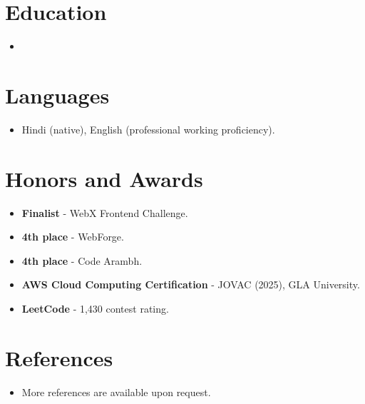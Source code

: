 \documentclass[11pt,a4paper,sans]{moderncv}
\begin{document}

\section{Education}
\vspace{1pt}
\begin{itemize}

\item{}

\end{itemize}


\section{Languages}
\vspace{1pt}
\begin{itemize}
\item {Hindi (native), English (professional working proficiency).}
\end{itemize}


\section{Honors and Awards}
\vspace{1pt}
\begin{itemize}
\item{\textbf{Finalist} - WebX Frontend Challenge.}
\item{\textbf{4th place} - WebForge.}
\item{\textbf{4th place} - Code Arambh.}
\item{\textbf{AWS Cloud Computing Certification} - JOVAC (2025), GLA University.}
\item{\textbf{LeetCode} - 1,430 contest rating.}
\end{itemize}


\section{References}
\vspace{1pt}
\begin{itemize}
\item{More references are available upon request.}
\end{itemize}
\end{document}
